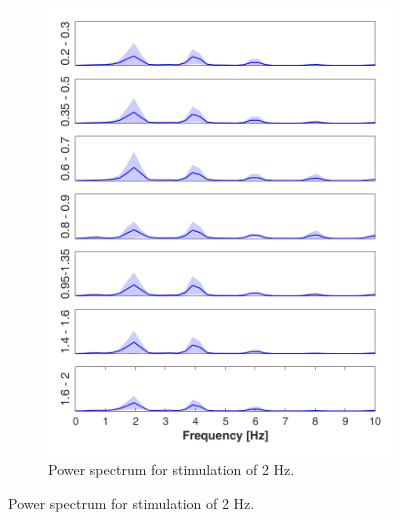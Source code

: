 \documentclass{pracalicmgr}
\begin{document}
\begin{figure}[H]
\begin{subfigure}{.5\textwidth}
		\includegraphics[width=1.\linewidth]{widmo_2Hz.png}
		\caption{Power spectrum for stimulation of 2 Hz.}
		\label{rys:widmo_2Hz}
	\end{subfigure}
	
\end{figure}
\end{document}
